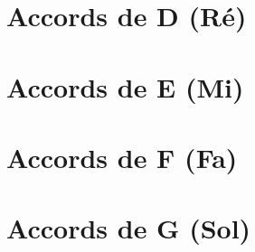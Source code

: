 \newpage
\section{Accords de D (Ré)}
\usebox{\D}
\usebox{\Dalt}
\usebox{\Dm}
\usebox{\Dmalt}
\usebox{\Dfive}
\usebox{\Dseven}
\usebox{\Dsevenalt}
\usebox{\Dmajseven}
\usebox{\Dmajsevenalt}
\usebox{\Dmseven}
\usebox{\Dmsevenalt}
\usebox{\Dsusfour}
\usebox{\Dsusfouralt}
\usebox{\Daddnine}
\usebox{\Dsustwo}
\usebox{\Dsustwoalt}
\usebox{\Dsevensusfour}
\usebox{\Dsevensusfouralt}
\usebox{\Dsevensharpnine}
\usebox{\Dnine}

\newpage
\section{Accords de E (Mi)}
\usebox{\E}
\usebox{\Ealt}
\usebox{\Em}
\usebox{\Emalt}
\usebox{\Efive}
\usebox{\Eseven}
\usebox{\Esevenalt}
\usebox{\Emajseven}
\usebox{\Emajsevenalt}
\usebox{\Emseven}
\usebox{\Emsevenalt}
\usebox{\Esusfour}
\usebox{\Esusfouralt}
\usebox{\Eaddnine}
\usebox{\Esustwo}
\usebox{\Esustwoalt}
\usebox{\Esevensusfour}
\usebox{\Esevensusfouralt}
\usebox{\Esevensharpnine}
\usebox{\Enine}

\newpage
\section{Accords de F (Fa)}
\usebox{\F}
\usebox{\Falt}
\usebox{\Fm}
\usebox{\Ffive}
\usebox{\Fseven}
\usebox{\Fmajseven}
\usebox{\Fmajsevenalt}
\usebox{\Fmseven}
\usebox{\Fsusfour}
\usebox{\Faddnine}
\usebox{\Fsustwo}
\usebox{\Fsevensusfour}
\usebox{\Fsevensharpnine}
\usebox{\Fnine}

\newpage
\section{Accords de G (Sol)}
\usebox{\G}
\usebox{\Galt}
\usebox{\Gm}
\usebox{\Gfive}
\usebox{\Gseven}
\usebox{\Gsevenalt}
\usebox{\Gmajseven}
\usebox{\Gmajsevenalt}
\usebox{\Gmseven}
\usebox{\Gsusfour}
\usebox{\Gaddnine}
\usebox{\Gsustwo}
\usebox{\Gsevensusfour}
\usebox{\Gsevensharpnine}
\usebox{\Gnine}